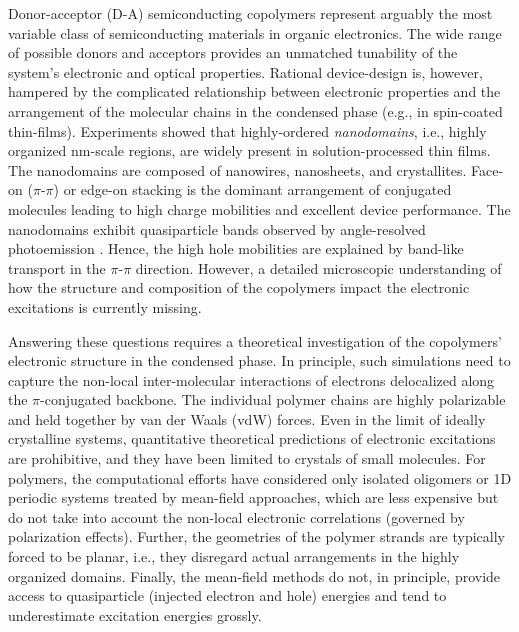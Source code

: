 \documentclass[journal = jpclcd]{achemso}
\begin{document}
Donor-acceptor (D-A) semiconducting copolymers represent arguably the most variable class of semiconducting materials in organic electronics.\cite{Gunes2007,Heeger2010,Facchetti2011,Wang2012} The wide range of possible donors and acceptors provides an unmatched tunability of the system's electronic and optical properties.\cite{Yuen2011,Li2012,Zhang2013} Rational device-design is, however, hampered by the complicated relationship between electronic properties and the arrangement of the molecular chains in the condensed phase (e.g., in spin-coated thin-films).\cite{Schwartz2003,Noriega2013} Experiments showed that highly-ordered \emph{nanodomains}, i.e., highly organized nm-scale regions, are widely present in solution-processed thin films. The nanodomains are composed of nanowires,\cite{Oh2009} nanosheets,\cite{Barzegar2018} and crystallites.\cite{Sirringhaus1999,Venkateshvaran2014,Luo2014,Li2016} Face-on ($\pi$-$\pi$) or edge-on stacking is the dominant arrangement of conjugated molecules leading to high charge mobilities and excellent device performance.\cite{Oh2009,Barzegar2018,Sirringhaus1999,Venkateshvaran2014,Luo2014,Li2016} The nanodomains exhibit quasiparticle bands observed by angle-resolved photoemission \cite{Hsu2015}. Hence, the high hole mobilities are explained by band-like transport\cite{Sakanoue2010,Yamashita2014} in the $\pi$-$\pi$ direction\cite{Sirringhaus1999,Luo2014,Kim2014}. However, a detailed microscopic understanding of how the structure and composition of the copolymers impact the electronic excitations is currently missing.

Answering these questions requires a theoretical investigation of the copolymers' electronic structure in the condensed phase. In principle, such simulations need to capture the non-local inter-molecular interactions \cite{Sutton2016} of electrons delocalized along the $\pi$-conjugated backbone.\cite{Hsu2015} The individual polymer chains are highly polarizable and held together by van der Waals (vdW) forces. Even in the limit of ideally crystalline systems, quantitative theoretical predictions of electronic excitations are prohibitive, and they have been limited to crystals of small molecules\cite{Norton2008,Nayak2009,Difley2010,Ryno2013,Refaely-Abramson2013,Poelking2015,Kang2016,Li2016_Blase,Sun2016,Li2018,Bhandari2018}. For polymers, the computational efforts have considered only isolated\cite{Halls1999,Cornil2003} oligomers or 1D periodic systems\cite{Bredas1984,Bredas1985,cheng2017,He2018,Bredas2018} treated by mean-field approaches, which are less expensive but do not take into account the non-local electronic correlations (governed by polarization effects). \cite{Woods2016} Further, the geometries  of the polymer strands are typically forced to be planar, i.e., they disregard actual arrangements in the highly organized domains.\cite{Cornil2003,He2018} Finally, the mean-field methods do not, in principle, provide access to quasiparticle (injected electron and hole) energies and tend to underestimate excitation energies grossly.\cite{martin_reining_ceperley_2016}
\end{document}
